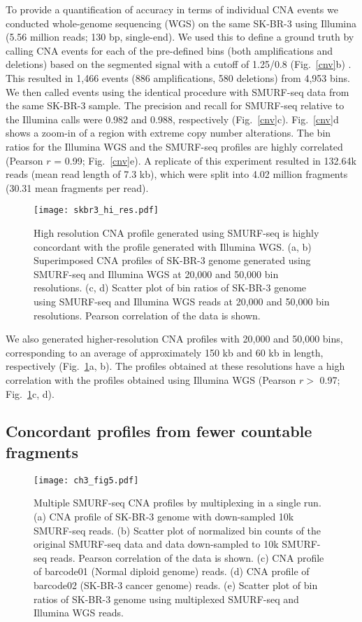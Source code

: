 To provide a quantification of accuracy in terms of individual CNA
events we conducted whole-genome sequencing (WGS) on the same SK-BR-3
using Illumina (5.56 million reads; 130 bp, single-end).  We used this
to define a ground truth by calling CNA events for each of the
pre-defined bins (both amplifications and deletions) based on the
segmented signal with a cutoff of 1.25/0.8 (Fig.~\ref{cnv}b)
\citep{dago2014rapid,berry2017potential}. This resulted in 1,466 events
(886 amplifications, 580 deletions) from 4,953 bins. We then called
events using the identical procedure with SMURF-seq data from the same
SK-BR-3 sample. The precision and recall for SMURF-seq relative to the
Illumina calls were 0.982 and 0.988, respectively (Fig.~\ref{cnv}c).
Fig.~\ref{cnv}d shows a zoom-in of a region with extreme copy number
alterations. The bin ratios for the Illumina WGS and the SMURF-seq
profiles are highly correlated (Pearson $r$ = 0.99; Fig.~\ref{cnv}e).
A replicate of this experiment resulted in 132.64k reads (mean read
length of 7.3 kb), which were split into 4.02 million fragments (30.31
mean fragments per read).

\begin{figure}[t!]
\centering
\texttt{[image: skbr3\_hi\_res.pdf]}
\caption[High resolution CNA profile with SMURF-seq]{
  High resolution CNA profile generated using SMURF-seq is highly concordant
  with the profile generated with Illumina WGS.
  (a, b) Superimposed CNA profiles of SK-BR-3 genome generated using SMURF-seq
  and Illumina WGS at 20,000 and 50,000 bin resolutions.
  (c, d) Scatter plot of bin ratios of SK-BR-3 genome using
  SMURF-seq and Illumina WGS reads at 20,000 and 50,000 bin resolutions.
  Pearson correlation of the data is shown.}
  \label{skbr3_hi_res}
\end{figure}

We also generated higher-resolution CNA profiles with 20,000 and 50,000
bins, corresponding to an average of approximately 150 kb and 60 kb in
length, respectively (Fig.~\ref{skbr3_hi_res}a, b). The profiles obtained
at these resolutions have a high correlation with the profiles obtained
using Illumina WGS (Pearson $r>$ 0.97; Fig.~\ref{skbr3_hi_res}c, d).

\subsection{Concordant profiles from fewer countable fragments}
\begin{figure}[t!]
\centering
\texttt{[image: ch3\_fig5.pdf]}
\caption[Multiple SMURF-seq CNA profiles by multiplexing in a single run]{
  Multiple SMURF-seq CNA profiles by multiplexing in a single run.
  (a) CNA profile of SK-BR-3 genome with down-sampled 10k SMURF-seq reads.
  (b) Scatter plot of normalized bin counts of the original SMURF-seq
  data and data down-sampled to 10k SMURF-seq reads. Pearson
  correlation of the data is shown.
  (c) CNA profile of barcode01 (Normal diploid genome) reads.
  (d) CNA profile of barcode02 (SK-BR-3 cancer genome) reads.
  (e) Scatter plot of bin ratios of SK-BR-3 genome using
  multiplexed SMURF-seq and Illumina WGS reads.}
\label{cnv_mux}
\end{figure}

